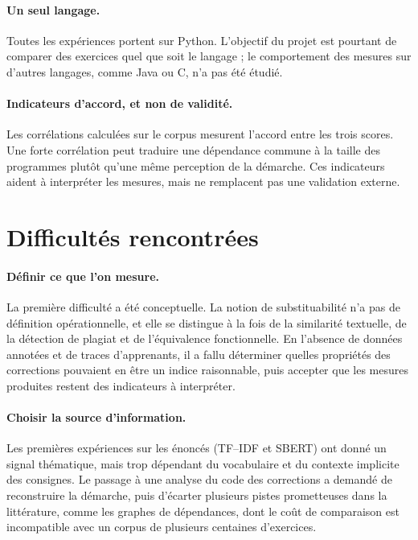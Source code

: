\documentclass[12pt,a4paper,oneside]{report}
\begin{document}
\paragraph{Un seul langage.}
Toutes les expériences portent sur Python. L'objectif du projet est
pourtant de comparer des exercices quel que soit le langage ; le
comportement des mesures sur d'autres langages, comme Java ou C, n'a pas été
étudié.

\paragraph{Indicateurs d'accord, et non de validité.}
Les corrélations calculées sur le corpus mesurent l'accord entre les trois
scores. Une forte corrélation peut traduire une dépendance commune à la
taille des programmes plutôt qu'une même perception de la démarche. Ces
indicateurs aident à interpréter
les mesures, mais ne remplacent pas une validation externe.

\section{Difficultés rencontrées}

\paragraph{Définir ce que l'on mesure.}
La première difficulté a été conceptuelle. La notion de substituabilité
n'a pas de définition opérationnelle, et elle se distingue à la fois de la
similarité textuelle, de la détection de plagiat et de l'équivalence
fonctionnelle. En l'absence de données annotées et de traces
d'apprenants, il a fallu déterminer quelles propriétés des corrections
pouvaient en être un indice raisonnable, puis accepter que les mesures
produites restent des indicateurs à interpréter.

\paragraph{Choisir la source d'information.}
Les premières expériences sur les énoncés (TF--IDF et SBERT) ont donné un
signal thématique, mais trop dépendant du vocabulaire et du contexte
implicite des consignes. Le passage à une analyse du code des corrections
a demandé de reconstruire la démarche, puis d'écarter plusieurs pistes
prometteuses dans la littérature, comme les graphes de dépendances, dont le
coût de comparaison est incompatible avec un corpus de plusieurs centaines
d'exercices.
\end{document}
